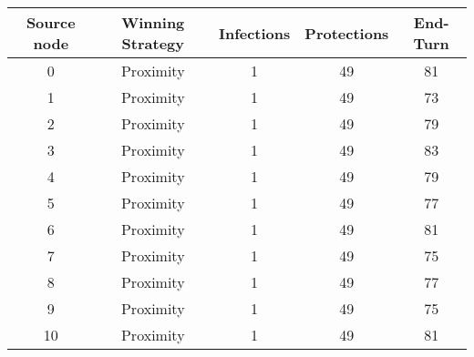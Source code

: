 \documentclass[results.tex]{subfiles}
\begin{document}
    \begin{center}
        \begin{tabular}{| c || c | c | c | c |}
            \hline
            {\bfseries Source node} & {\bfseries Winning Strategy} & {\bfseries Infections} & {\bfseries Protections}
            & {\bfseries End-Turn}
            \\  %
            \hline\hline
            0                       & Proximity                    & 1                      & 49                      & 81                   \\
            \hline
            1                       & Proximity                    & 1                      & 49                      & 73                   \\
            \hline
            2                       & Proximity                    & 1                      & 49                      & 79                   \\
            \hline
            3                       & Proximity                    & 1                      & 49                      & 83                   \\
            \hline
            4                       & Proximity                    & 1                      & 49                      & 79                   \\
            \hline
            5                       & Proximity                    & 1                      & 49                      & 77                   \\
            \hline
            6                       & Proximity                    & 1                      & 49                      & 81                   \\
            \hline
            7                       & Proximity                    & 1                      & 49                      & 75                   \\
            \hline
            8                       & Proximity                    & 1                      & 49                      & 77                   \\
            \hline
            9                       & Proximity                    & 1                      & 49                      & 75                   \\
            \hline
            10                      & Proximity                    & 1                      & 49                      & 81                   \\

\end{tabular}
\end{center}
\end{document}
